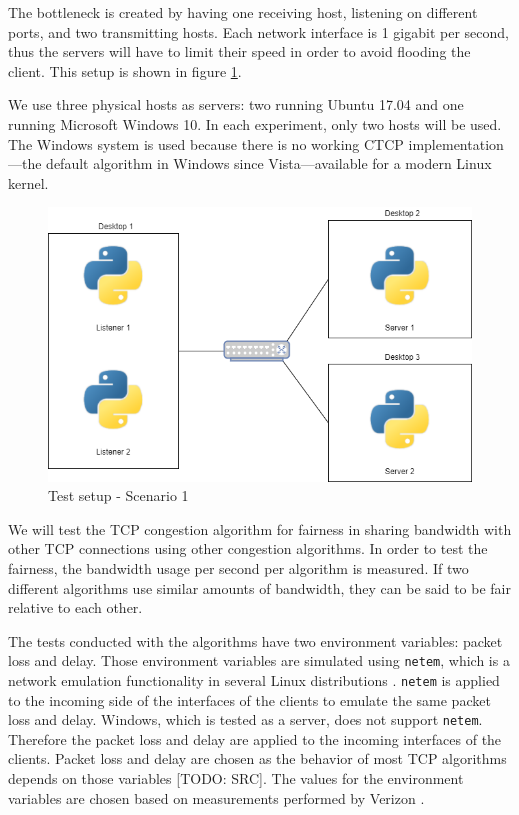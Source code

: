 \documentclass{article}
\begin{document}
The bottleneck is created by having one receiving host, listening on different
ports, and two transmitting hosts. Each network interface is 1 gigabit per
second, thus the servers will have to limit their speed in order to avoid
flooding the client. This setup is shown in figure \ref{fig:setup1}.

We use three physical hosts as servers: two running Ubuntu 17.04 and one
running Microsoft Windows 10. In each experiment, only two hosts will be used.
The Windows system is used because there is no working CTCP
implementation---the default algorithm in Windows since Vista---available for a
modern Linux kernel.

\begin{figure}[H]
	\centering
		\includegraphics[scale=0.5]{figs/setup2.png}
		\caption{Test setup - Scenario 1}
	\label{fig:setup1}
\end{figure}

We will test the TCP congestion algorithm for fairness in sharing bandwidth
with other TCP connections using other congestion algorithms. In order to test
the fairness, the bandwidth usage per second per algorithm is measured. If two
different algorithms use similar amounts of bandwidth, they can be said to be
fair relative to each other.

The tests conducted with the algorithms have two environment variables: packet loss and delay. Those environment variables are simulated using \texttt{netem}, which is a network emulation functionality in several Linux distributions \cite{linux-netem}. \texttt{netem} is applied to the incoming side of the interfaces of the clients to emulate the same packet loss and delay. Windows, which is tested as a server, does not support \texttt{netem}. Therefore the packet loss and delay are applied to the incoming interfaces of the clients. Packet loss and delay are chosen as the behavior of most TCP algorithms depends on those variables [TODO: SRC]. The values for the environment variables are chosen based on measurements performed by Verizon \cite{verizon-latency}.
\end{document}
